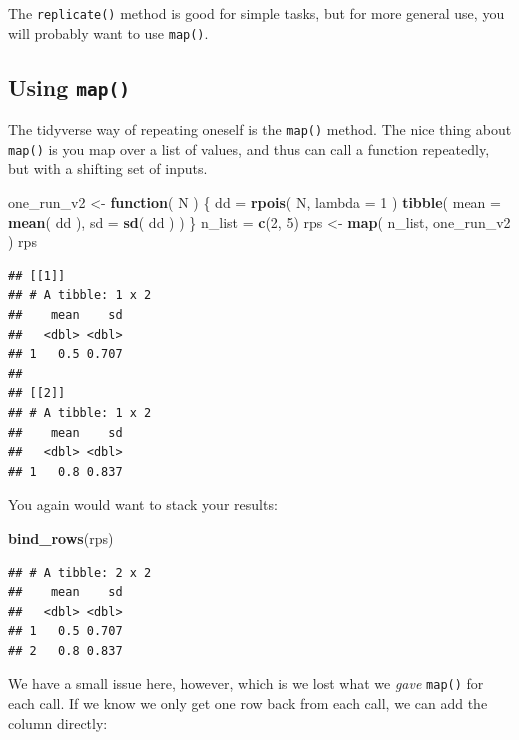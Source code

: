 \documentclass[
]{book}
\newenvironment{Shaded}{\begin{snugshade}}{\end{snugshade}}
\newcommand{\AttributeTok}[1]{\textcolor[rgb]{0.13,0.29,0.53}{#1}}
\newcommand{\ControlFlowTok}[1]{\textcolor[rgb]{0.13,0.29,0.53}{\textbf{#1}}}
\newcommand{\DecValTok}[1]{\textcolor[rgb]{0.00,0.00,0.81}{#1}}
\newcommand{\FunctionTok}[1]{\textcolor[rgb]{0.13,0.29,0.53}{\textbf{#1}}}
\newcommand{\NormalTok}[1]{#1}
\newcommand{\OtherTok}[1]{\textcolor[rgb]{0.56,0.35,0.01}{#1}}
\begin{document}
The \texttt{replicate()} method is good for simple tasks, but for more general use, you will probably want to use \texttt{map()}.

\subsection{\texorpdfstring{Using \texttt{map()}}{Using map()}}\label{using-map}

The tidyverse way of repeating oneself is the \texttt{map()} method. The nice thing about \texttt{map()} is you map over a list of values, and thus can call a function repeatedly, but with a shifting set of inputs.

\begin{Shaded}
\begin{Highlighting}[]
\NormalTok{one\_run\_v2 }\OtherTok{\textless{}{-}} \ControlFlowTok{function}\NormalTok{( N ) \{}
\NormalTok{  dd }\OtherTok{=} \FunctionTok{rpois}\NormalTok{( N, }\AttributeTok{lambda =} \DecValTok{1}\NormalTok{ )}
  \FunctionTok{tibble}\NormalTok{( }\AttributeTok{mean =} \FunctionTok{mean}\NormalTok{( dd ), }\AttributeTok{sd =} \FunctionTok{sd}\NormalTok{( dd ) )}
\NormalTok{\}}
\NormalTok{n\_list }\OtherTok{=} \FunctionTok{c}\NormalTok{(}\DecValTok{2}\NormalTok{, }\DecValTok{5}\NormalTok{)}
\NormalTok{rps }\OtherTok{\textless{}{-}} \FunctionTok{map}\NormalTok{( n\_list, one\_run\_v2 )}
\NormalTok{rps}
\end{Highlighting}
\end{Shaded}

\begin{verbatim}
## [[1]]
## # A tibble: 1 x 2
##    mean    sd
##   <dbl> <dbl>
## 1   0.5 0.707
## 
## [[2]]
## # A tibble: 1 x 2
##    mean    sd
##   <dbl> <dbl>
## 1   0.8 0.837
\end{verbatim}

You again would want to stack your results:

\begin{Shaded}
\begin{Highlighting}[]
\FunctionTok{bind\_rows}\NormalTok{(rps)}
\end{Highlighting}
\end{Shaded}

\begin{verbatim}
## # A tibble: 2 x 2
##    mean    sd
##   <dbl> <dbl>
## 1   0.5 0.707
## 2   0.8 0.837
\end{verbatim}

We have a small issue here, however, which is we lost what we \emph{gave} \texttt{map()} for each call.
If we know we only get one row back from each call, we can add the column directly:
\end{document}
